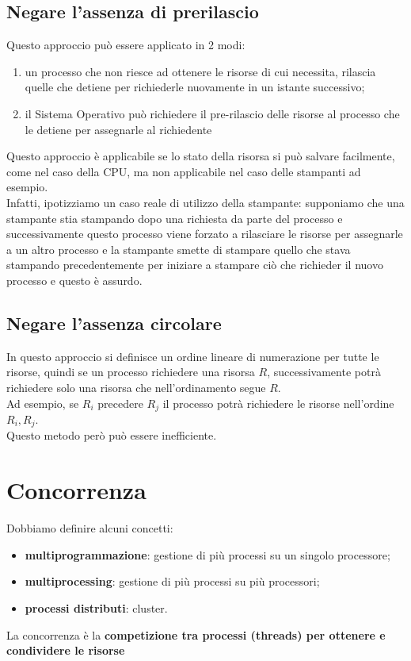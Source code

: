 \documentclass[12pt, letterpaper]{report}
\begin{document}
	\subsection{Negare l'assenza di prerilascio}
	Questo approccio può essere applicato in 2 modi:
	\begin{enumerate}
		\item un processo che non riesce ad ottenere le risorse di cui necessita, rilascia quelle che detiene per richiederle nuovamente in un istante successivo;
		\item il Sistema Operativo può richiedere il pre-rilascio delle risorse al processo che le detiene per assegnarle al richiedente
	\end{enumerate}
	Questo approccio è applicabile se lo stato della risorsa si può salvare facilmente, come nel caso della CPU, ma non applicabile nel caso delle stampanti ad esempio. \\
	Infatti, ipotizziamo un caso reale di utilizzo della stampante: supponiamo che una stampante stia stampando dopo una richiesta da parte del processo e successivamente questo processo viene forzato a rilasciare le risorse per assegnarle a un altro processo e la stampante smette di stampare quello che stava stampando precedentemente per iniziare a stampare ciò che richieder il nuovo processo e questo è assurdo.
	\subsection{Negare l'assenza circolare}
	In questo approccio si definisce un ordine lineare di numerazione per tutte le risorse, quindi se un processo richiedere una risorsa $R$, successivamente potrà richiedere solo una risorsa che nell'ordinamento segue $R$. \\
	Ad esempio, se $R_i$ precedere $R_j$ il processo potrà richiedere le risorse nell'ordine $R_i, R_j$. \\
	Questo metodo però può essere inefficiente.
	\section{Concorrenza}
	Dobbiamo definire alcuni concetti:
	\begin{itemize}
		\item \textbf{multiprogrammazione}: gestione di più processi su un singolo processore;
		\item \textbf{multiprocessing}: gestione di più processi su più processori;
		\item \textbf{processi distributi}: cluster.
	\end{itemize}
	La concorrenza è la \textbf{competizione tra processi (threads) per ottenere e condividere le risorse}
\end{document}
